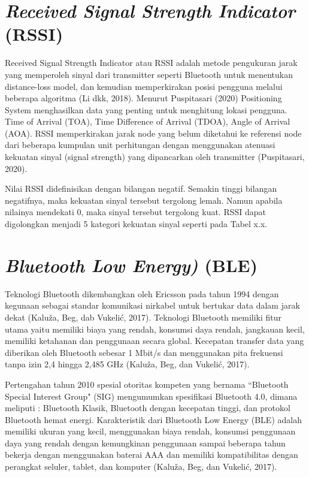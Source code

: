 \section{\textit{Received Signal Strength Indicator} (RSSI)}
Received Signal Strength Indicator atau RSSI adalah metode pengukuran jarak yang memperoleh sinyal dari transmitter seperti Bluetooth untuk menentukan distance-loss model, dan kemudian memperkirakan posisi pengguna melalui beberapa algoritma (Li dkk, 2018). Menurut Puspitasari (2020) Positioning System menghasilkan data yang penting untuk menghitung lokasi pengguna. Time of Arrival (TOA), Time Difference of Arrival (TDOA), Angle of Arrival (AOA). RSSI memperkirakan jarak node yang belum diketahui ke referensi node dari beberapa kumpulan unit perhitungan dengan menggunakan atenuasi kekuatan sinyal (signal strength) yang dipancarkan oleh transmitter (Puspitasari, 2020).

\par Nilai RSSI didefinisikan dengan bilangan negatif. Semakin tinggi bilangan negatifnya, maka kekuatan sinyal tersebut tergolong lemah. Namun apabila nilainya mendekati 0, maka sinyal tersebut tergolong kuat. RSSI dapat digolongkan menjadi 5 kategori kekuatan sinyal seperti pada Tabel x.x.


\section{\textit{Bluetooth Low Energy)} (BLE)}
Teknologi Bluetooth dikembangkan oleh Ericsson pada tahun 1994 dengan kegunaan sebagai standar komunikasi nirkabel untuk bertukar data dalam jarak dekat (Kaluža, Beg, dab Vukelić, 2017). Teknologi Bluetooth memiliki fitur utama yaitu memiliki biaya yang rendah, konsumsi daya rendah, jangkauan kecil, memiliki ketahanan dan penggunaan secara global. Kecepatan transfer data yang diberikan oleh Bluetooth sebesar 1 Mbit/s dan menggunakan pita frekuensi tanpa izin 2,4 hingga 2,485 GHz (Kaluža, Beg, dan Vukelić, 2017).

\par Pertengahan tahun 2010 spesial otoritas kompeten yang bernama “Bluetooth Special Interest Group" (SIG) mengumumkan spesifikasi Bluetooth 4.0, dimana meliputi : Bluetooth Klasik, Bluetooth dengan kecepatan tinggi, dan protokol Bluetooth hemat energi. Karakteristik dari Bluetooth Low Energy (BLE) adalah memiliki ukuran yang kecil, menggunakan biaya rendah, konsumsi penggunaan daya yang rendah dengan kemungkinan penggunaan sampai beberapa tahun bekerja dengan menggunakan baterai AAA dan memiliki kompatibilitas dengan perangkat seluler, tablet, dan komputer (Kaluža, Beg, dan Vukelić, 2017).



